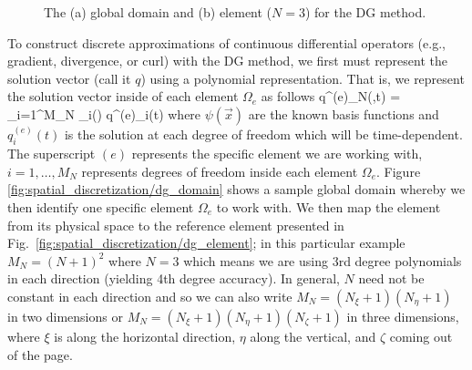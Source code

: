 \documentclass{article}
\begin{document}
\begin{figure}[htbp]
\begin{center}
\end{center}
\caption{The (a) global domain and (b) element ($N=3$) for the DG method.}
\label{fig:spatial_discretization/dg_method}
\end{figure}

To construct discrete approximations of continuous differential operators (e.g., gradient, divergence, or curl) with the DG method, we first must represent the solution vector (call it $q$) using a polynomial representation.  That is, we represent the solution vector inside of each element $\Omega_e$ as follows
\be
q^{(e)}_N(,t) = \sum_{i=1}^{M_N} \psi_i() q^{(e)}_i(t)
\label{eq:spatial_discretization/dg_method}
\ee
where $\psi(\vec{x})$ are the known basis functions and $q^{(e)}_i(t)$ is the solution at each degree of freedom which will be time-dependent.
The superscript $(e)$ represents the specific element we are working with, $i=1,\ldots,M_N$ represents degrees of freedom inside each element $\Omega_e$.  Figure \ref{fig:spatial_discretization/dg_domain} shows a sample global domain whereby we then identify one specific element $\Omega_e$ to work with.  We then map the element from its physical space to the reference element presented in Fig.\ \ref{fig:spatial_discretization/dg_element}; in this particular example $M_N=(N+1)^2$ where $N=3$ which means we are using 3rd degree polynomials in each direction (yielding 4th degree accuracy).  In general, $N$ need not be constant in each direction and so we can also write $M_N=(N_{\xi}+1)(N_{\eta}+1)$ in two dimensions or $M_N=(N_{\xi}+1)(N_{\eta}+1)(N_{\zeta}+1)$ in three dimensions, where $\xi$ is along the horizontal direction, $\eta$ along the vertical, and $\zeta$ coming out of the page. 
\end{document}
